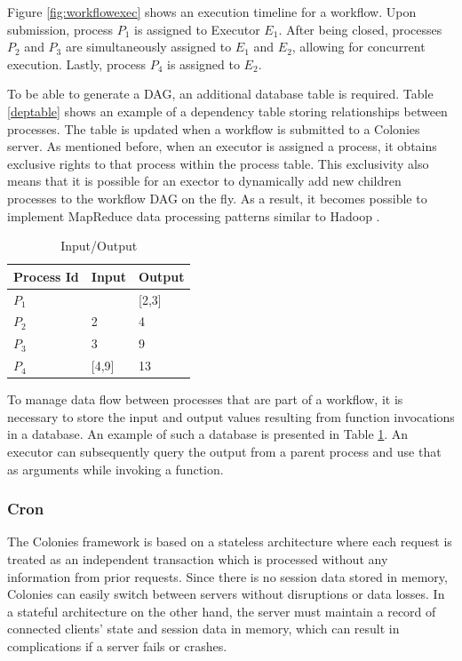 \documentclass{article}
\begin{document}
Figure \ref{fig:workflowexec} shows an execution timeline for a workflow. Upon submission, process \(P_{1}\) is assigned to Executor \(E_{1}\). After being closed, processes \(P_{2}\) and \(P_{3}\) are simultaneously assigned to \(E_{1}\) and \(E_{2}\), allowing for concurrent execution. Lastly, process \(P_{4}\) is assigned to \(E_{2}\).  

To be able to generate a DAG, an additional database table is required. Table \ref{deptable} shows an example of a dependency table storing relationships between processes. The table is updated when a workflow is submitted to a Colonies server. As mentioned before, when an executor is assigned a process, it obtains exclusive rights to that process within the process table. This exclusivity also means that it is possible for an exector to dynamically add new children processes to the workflow DAG on the fly. As a result, it becomes possible to implement MapReduce \cite{mapreduce} data processing patterns similar to Hadoop \cite{hadoop}.  

\begin{table}[h]
	\caption{Input/Output}
	\centering
	\begin{tabular}{lll}
		\toprule
		\cmidrule(r){1-2}
        Process Id & Input & Output \\
		\midrule
        $P_{1}$    & & [2,3] \\
        $P_{2}$    & 2 & 4 \\
        $P_{3}$    & 3 & 9 \\
        $P_{4}$    & [4,9] & 13 \\
		\bottomrule
	\end{tabular}
	\label{inouttable}
\end{table}

To manage data flow between processes that are part of a workflow, it is necessary to store the input and output values resulting from function invocations in a database. An example of such a database is presented in Table \ref{inouttable}. An executor can subsequently query the output from a parent process and use that as arguments while invoking a function.

\subsubsection{Cron}
The Colonies framework is based on a stateless architecture where each request is treated as an independent transaction which is processed without any information from prior requests. Since there is no session data stored in memory, Colonies can easily switch between servers without disruptions or data losses. In a stateful architecture on the other hand, the server must maintain a record of connected clients' state and session data in memory, which can result in complications if a server fails or crashes. 
\end{document}
